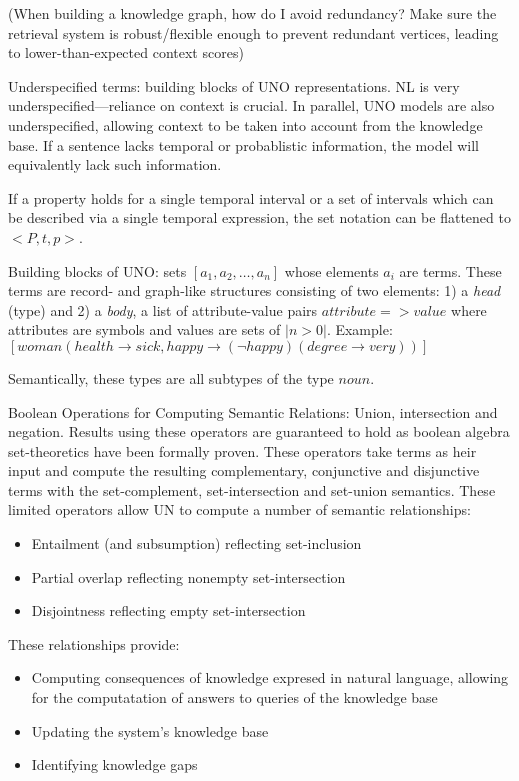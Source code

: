 \documentclass[11pt]{article}
\begin{document}
(When building a knowledge graph, how do I avoid redundancy? Make sure the retrieval system is robust/flexible enough to prevent redundant vertices, leading to lower-than-expected context scores)

Underspecified terms: building blocks of UNO representations.  NL is very underspecified---reliance on context is crucial.  In parallel, UNO models are also underspecified, allowing context to be taken into account from the knowledge base.  If a sentence lacks temporal or probablistic information, the model will equivalently lack such information.

If a property holds for a single temporal interval or a set of intervals which can be described via a single temporal expression, the set notation can be flattened to $<P, t, p>$.  

Building blocks of UNO: sets $[a_1,a_2,\dots,a_n]$ whose elements $a_i$ are terms.  These terms are record- and graph-like structures consisting of two elements: 1) a \emph{head} (type) and 2) a \emph{body}, a list of attribute-value pairs $attribute=>value$ where attributes are symbols and values are sets of $|n>0|$.  Example:
$[ woman (health \to sick,
           happy \to (\neg happy)(degree \to very))]$

Semantically, these types are all subtypes of the type $noun$.

Boolean Operations for Computing Semantic Relations: Union, intersection and negation.  Results using these operators are guaranteed to hold as boolean algebra set-theoretics have been formally proven.  These operators take terms as heir input and compute the resulting complementary, conjunctive and disjunctive terms with the set-complement, set-intersection and set-union semantics.  These limited operators allow UN to compute a number of semantic relationships:

\begin{itemize}
\item Entailment (and subsumption) reflecting set-inclusion
\item Partial overlap reflecting nonempty set-intersection
\item Disjointness reflecting empty set-intersection
\end{itemize}

These relationships provide:

\begin{itemize}
\item Computing consequences of knowledge expresed in natural language, allowing for the computatation of answers to queries of the knowledge base
\item Updating the system's knowledge base
\item Identifying knowledge gaps
\end{itemize}
\end{document}
